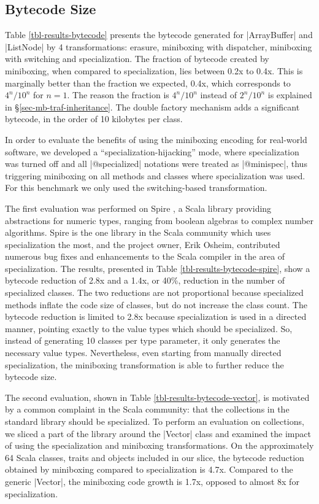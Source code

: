\subsection{Bytecode Size}
\label{subsec-eval-size}

Table \ref{tbl-results-bytecode} presents the bytecode generated for |ArrayBuffer| and |ListNode| by 4 transformations: erasure, miniboxing with dispatcher, miniboxing with switching and specialization. The fraction of bytecode created by miniboxing, when compared to specialization, lies between 0.2x to 0.4x. This is marginally better than the fraction we expected, 0.4x, which corresponds to $4^n / 10^n$ for $n=1$. The reason the fraction is $4^n / 10^n$ instead of $2^n / 10^n$ is explained in \S \ref{sec-mb-traf-inheritance}. The double factory mechanism adds a significant bytecode, in the order of 10 kilobytes per class.

In order to evaluate the benefits of using the miniboxing encoding for real-world software, we developed a ``specialization-hijacking'' mode, where specialization was turned off and all |@specialized| notations were treated as |@minispec|, thus triggering miniboxing on all methods and classes where specialization was used. For this benchmark we only used the switching-based transformation.
 
The first evaluation was performed on Spire \cite{erik-spire}, a Scala library providing abstractions for numeric types, ranging from boolean algebras to complex number algorithms. Spire is the one library in the Scala community which uses specialization the most, and the project owner, Erik Osheim, contributed numerous bug fixes and enhancements to the Scala compiler in the area of specialization. The results, presented in Table \ref{tbl-results-bytecode-spire}, show a bytecode reduction of 2.8x and a 1.4x, or 40\%, reduction in the number of specialized classes. The two reductions are not proportional because specialized methods inflate the code size of classes, but do not increase the class count. The bytecode reduction is limited to 2.8x because specialization is used in a directed manner, pointing exactly to the value types which should be specialized. So, instead of generating 10 classes per type parameter, it only generates the necessary value types. Nevertheless, even starting from manually directed specialization, the miniboxing transformation is able to further reduce the bytecode size.    

The second evaluation, shown in Table \ref{tbl-results-bytecode-vector}, is motivated by a common complaint in the Scala community: that the collections in the standard library should be specialized. To perform an evaluation on collections, we sliced a part of the library around the |Vector| class and examined the impact of using the specialization and miniboxing transformations. On the approximately 64 Scala classes, traits and objects included in our slice, the bytecode reduction obtained by miniboxing compared to specialization is 4.7x. Compared to the generic |Vector|, the miniboxing code growth is 1.7x, opposed to almost 8x for specialization. 

